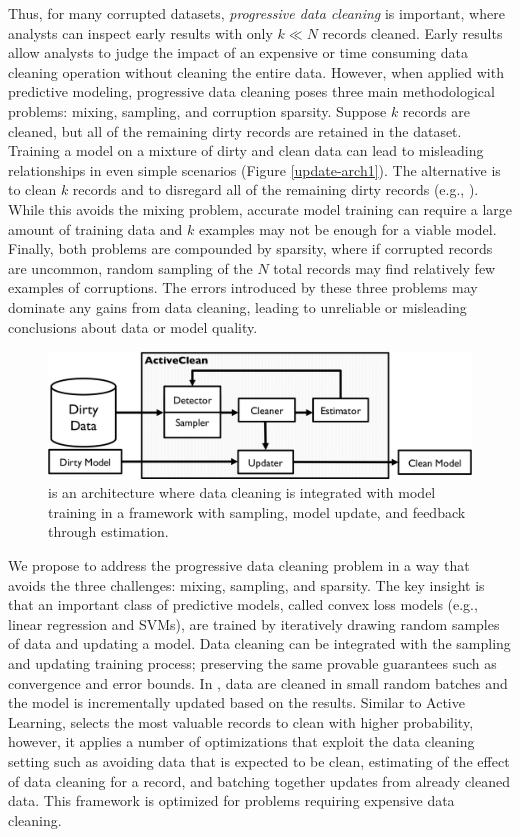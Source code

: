 Thus, for many corrupted datasets, \emph{progressive data cleaning} is important, where analysts can inspect early results with only $k \ll N$ records cleaned.
Early results allow analysts to judge the impact of an expensive or time consuming data cleaning operation without cleaning the entire data.
However, when applied with predictive modeling, progressive data cleaning poses three main methodological problems: mixing, sampling, and corruption sparsity.
Suppose $k$ records are cleaned, but all of the remaining dirty records are retained in the dataset.
Training a model on a mixture of dirty and clean data can lead to misleading relationships in even simple scenarios (Figure \ref{update-arch1}).
The alternative is to clean $k$ records and to disregard all of the remaining dirty records (e.g., \cite{wang1999sample}).
While this avoids the mixing problem, accurate model training can require a large amount of training data and $k$ examples may not be enough for a viable model.
Finally, both problems are compounded by sparsity, where if corrupted records are uncommon, random sampling of the $N$ total records may find relatively few examples of corruptions.
The errors introduced by these three problems may dominate any gains from data cleaning, leading to unreliable or misleading conclusions about data or model quality.

\begin{figure}[t]
\centering
 \includegraphics[width=\columnwidth]{figs/arch.png}
 \caption{\sysfull is an architecture where data cleaning is integrated with model training in a framework with sampling, model update, and feedback through estimation. \label{sys-arch}}\vspace{-2em}
\end{figure}

We propose \sys to address the progressive data cleaning problem in a way that avoids the three challenges: mixing, sampling, and sparsity.
The key insight is that an important class of predictive models, called convex loss models (e.g., linear regression and SVMs), are trained by iteratively drawing random samples of data and updating a model\cite{bertsekas2011incremental}.
Data cleaning can be integrated with the sampling and updating training process; preserving the same provable guarantees such as convergence and error bounds.
In \sys, data are cleaned in small random batches and the model is incrementally updated based on the results.
Similar to Active Learning, \sys selects the most valuable records to clean with higher probability, however, it applies a number of optimizations that exploit the data cleaning setting such as avoiding data that is expected to be clean, estimating of the effect of data cleaning for a record, and batching together updates from already cleaned data.
This framework is optimized for problems requiring expensive data cleaning.

